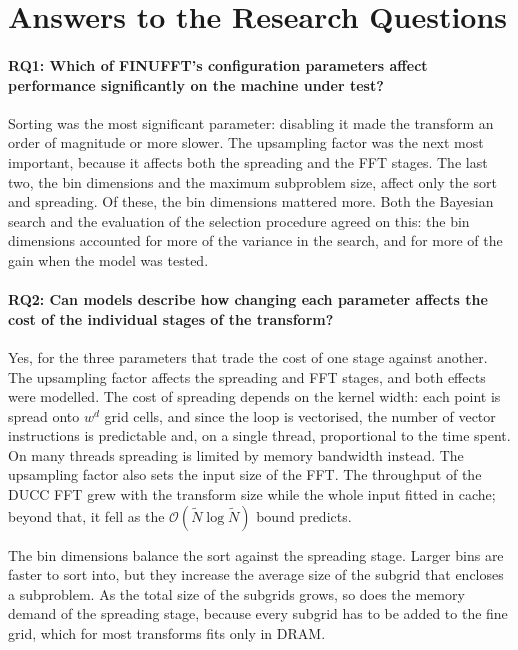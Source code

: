 \section{Answers to the Research Questions}
\label{sec:rq_answers}

\paragraph{RQ1: Which of FINUFFT's configuration parameters affect performance
significantly on the machine under test?}
Sorting was the most significant parameter: disabling it made the transform an
order of magnitude or more slower. The upsampling factor was the next most
important, because it affects both the spreading and the FFT stages. The last
two, the bin dimensions and the maximum subproblem size, affect only the sort and
spreading. Of these, the bin dimensions mattered more. Both the Bayesian search
and the evaluation of the selection procedure agreed on this: the bin dimensions
accounted for more of the variance in the search, and for more of the gain when
the model was tested.

\paragraph{RQ2: Can models describe how changing each parameter affects the
cost of the individual stages of the transform?}
Yes, for the three parameters that trade the cost of one stage against another.
The upsampling factor affects the spreading and FFT stages, and both effects
were modelled. The cost of spreading depends on the kernel width: each point is
spread onto $w^d$ grid cells, and since the loop is vectorised, the number of
vector instructions is predictable and, on a single thread, proportional to the
time spent. On many threads spreading is limited by memory bandwidth instead. The
upsampling factor also sets the input size of the FFT. The throughput of the
DUCC FFT grew with the transform size while the whole input fitted in cache;
beyond that, it fell as the $\mathcal{O}(\tilde{N} \log \tilde{N})$ bound
predicts.

The bin dimensions balance the sort against the spreading stage. Larger bins are
faster to sort into, but they increase the average size of the subgrid that
encloses a subproblem. As the total size of the subgrids grows, so does the
memory demand of the spreading stage, because every subgrid has to be added to
the fine grid, which for most transforms fits only in DRAM.

